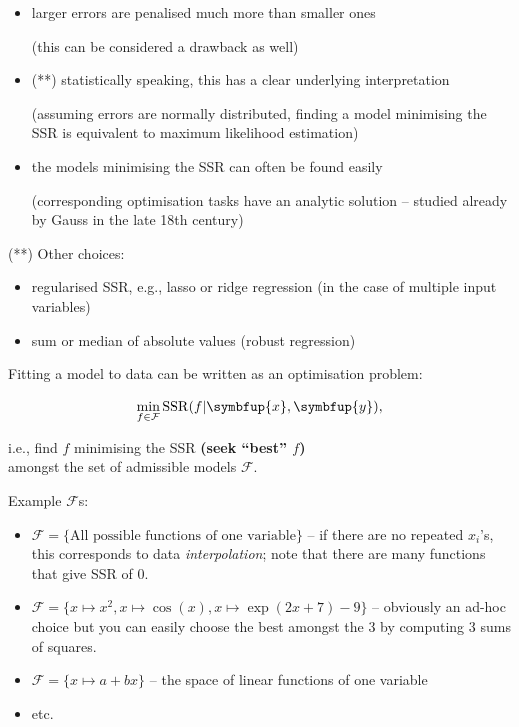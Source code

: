 \documentclass[10pt,b5paper,krantz1]{krantz}
\providecommand{\tightlist}{%
  \setlength{\itemsep}{0pt}\setlength{\parskip}{0pt}}
\renewcommand{\mathbf}[1]{\symbfup{#1}}
\renewenvironment{quote}{\begin{VF}}{\end{VF}}
\begin{document}
\begin{itemize}
\item
  larger errors are penalised much more than smaller ones

  \begin{quote}
  (this can be considered a drawback as well)
  \end{quote}
\item
  (**) statistically speaking, this has a clear underlying interpretation

  \begin{quote}
  (assuming errors are normally distributed,
  finding a model minimising the SSR is equivalent
  to maximum likelihood estimation)
  \end{quote}
\item
  the models minimising the SSR can often be found easily

  \begin{quote}
  (corresponding optimisation tasks have an analytic solution --
  studied already by Gauss in the late 18th century)
  \end{quote}
\end{itemize}

(**) Other choices:

\begin{itemize}
\tightlist
\item
  regularised SSR, e.g., lasso or ridge regression (in the case of multiple input variables)
\item
  sum or median of absolute values (robust regression)
\end{itemize}

Fitting a model to data can be written as an optimisation problem:

\[
\min_{f\in\mathcal{F}} \mathrm{SSR}(f|\mathbf{x},\mathbf{y}),
\]

i.e., find \(f\) minimising the SSR \textbf{(seek ``best'' \(f\))}\\
amongst the set of admissible models \(\mathcal{F}\).

Example \(\mathcal{F}\)s:

\begin{itemize}
\item
  \(\mathcal{F}=\{\text{All possible functions of one variable}\}\) -- if there are no repeated
  \(x_i\)'s, this corresponds to data \emph{interpolation}; note that there
  are many functions that give SSR of \(0\).
\item
  \(\mathcal{F}=\{ x\mapsto x^2, x\mapsto \cos(x), x\mapsto \exp(2x+7)-9 \}\) -- obviously
  an ad-hoc choice but you can easily choose the best amongst the 3 by computing 3 sums of squares.
\item
  \(\mathcal{F}=\{ x\mapsto a+bx\}\) -- the space of linear functions of one variable
\item
  etc.
\end{itemize}
\end{document}
